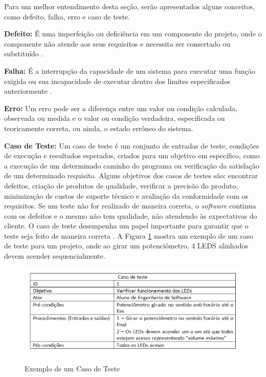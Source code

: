 Para um melhor entendimento desta seção, serão apresentados alguns conceitos, como defeito, falha, erro e caso de teste.

\textbf{Defeito:} É uma imperfeição ou deficiência em um componente do projeto, onde o componente não atende aos seus requisitos e necessita ser consertado ou substituído \cite{PMBOK2013}.

\textbf{Falha:} É a interrupção da capacidade de um sistema para executar uma função exigida ou sua incapacidade de executar dentro dos limites especificados anteriormente \cite{ISOEC15026}.

\textbf{Erro:} Um erro pode ser a diferença entre um valor ou condição calculada, observada ou medida e o valor ou condição verdadeira, especificada ou teoricamente correta, ou ainda, o estado errôneo do sistema. \cite{ISOEC15026}

\textbf{Caso de Teste:} Um caso de teste é um conjunto de entradas de teste, condições de execução e resultados esperados, criados para um objetivo em específico, como a execução de um determinado caminho do programa ou verificação da satisfação de um determinado requisito. Alguns objetivos dos casos de testes são: encontrar defeitos, criação de produtos de qualidade, verificar a precisão do produto, minimização de custos de suporte técnico e avaliação da conformidade com os requisitos. Se um teste não for realizado de maneira correta, o \textit{software} continua com os defeitos e o mesmo não tem qualidade, não atendendo às expectativas do cliente. O caso de teste desempenha um papel importante para garantir que o teste seja feito de maneira correta \cite{ieeeTestCase2014}. A Figura \ref{fig:figura-exemplo-caso-de-teste} mostra um exemplo de um caso de teste para um projeto, onde ao girar um potenciômetro, 4 LEDS alinhados devem acender sequencialmente.

\begin{figure}[!htb]
    \centering
    \caption{Exemplo de um Caso de Teste}
    \includegraphics[width=1\textwidth]{./dados/figuras/casoDeTeste}
    \label{fig:figura-exemplo-caso-de-teste}
\end{figure}

